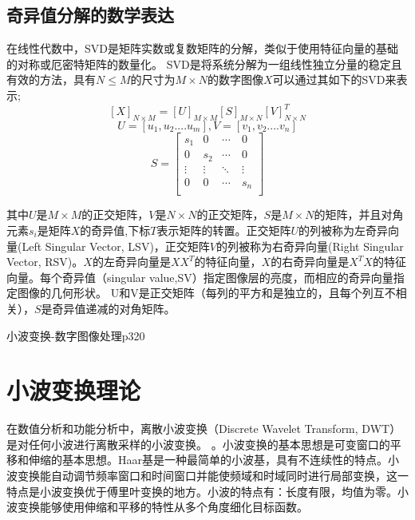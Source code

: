 \documentclass[12pt]{book}
\begin{document}
			\subsection{奇异值分解的数学表达}在线性代数中，SVD是矩阵实数或复数矩阵的分解，类似于使用特征向量的基础的对称或厄密特矩阵的数量化。 SVD是将系统分解为一组线性独立分量的稳定且有效的方法，具有$N \leq M$的尺寸为$M×N$的数字图像$X$可以通过其如下的SVD来表示;
\begin{equation}	\left[ X \right] _{N×M}=\left[ U \right] _{M×M} \left[ S \right] _{M×N} \left[ V \right] ^T_{N×N}	\end{equation}			
\[ U=[u_1,u_2....u_m],	V=[v_1,v_2....v_n] \]
\[
S
=\begin{bmatrix}
s_1  &  0  & \cdots\ &0\\
0  &  s_2  & \cdots\ & 0\\
 \vdots   & \vdots & \ddots  & \vdots  \\
 0 & 0  & \cdots\ & s_n\\
\end{bmatrix}
\]

其中$U$是$M×M$的正交矩阵，$V$是$N×N$的正交矩阵，$S$是$M×N$的矩阵，并且对角元素$s_i$是矩阵$X$的奇异值,下标$T$表示矩阵的转置。正交矩阵$U$的列被称为左奇异向量(Left Singular Vector, LSV)，正交矩阵$V$的列被称为右奇异向量(Right Singular Vector, RSV)。$X$的左奇异向量是$XX^T$的特征向量，$X$的右奇异向量是$X^TX$的特征向量。每个奇异值（singular value,SV）指定图像层的亮度，而相应的奇异向量指定图像的几何形状。 U和V是正交矩阵（每列的平方和是独立的，且每个列互不相关），$S$是奇异值递减的对角矩阵。%

		小波变换-数字图像处理p320
		\section{小波变换理论}在数值分析和功能分析中，离散小波变换（Discrete Wavelet Transform, DWT）是对任何小波进行离散采样的小波变换。 。小波变换的基本思想是可变窗口的平移和伸缩的基本思想。Haar基是一种最简单的小波基，具有不连续性的特点。小波变换能自动调节频率窗口和时间窗口并能使频域和时域同时进行局部变换，这一特点是小波变换优于傅里叶变换的地方。小波的特点有：长度有限，均值为零。小波变换能够使用伸缩和平移的特性从多个角度细化目标函数。
\end{document}
